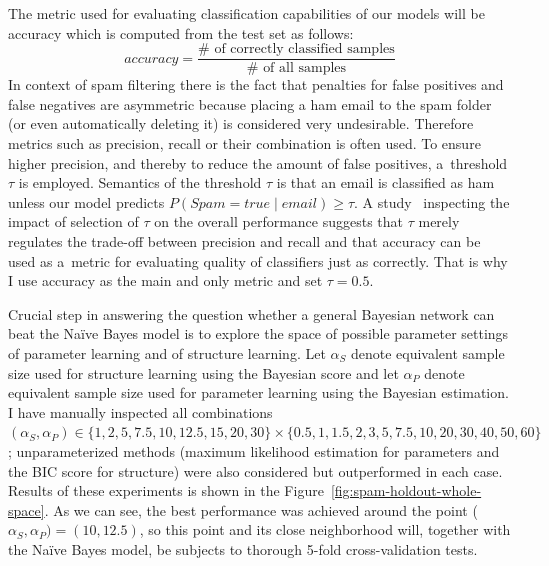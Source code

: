 \documentclass[english,cover]{fitthesis} %
\begin{document}
The metric used for evaluating  classification capabilities of our models will be accuracy which is computed from the test set as follows:
$$accuracy = \frac{\# \text{ of correctly classified samples}}{\# \text{ of all samples}}$$
In context of spam filtering there is the fact that penalties for false positives and false negatives are asymmetric because placing a ham email to the spam folder (or even automatically deleting it) is considered very undesirable. Therefore metrics such as precision, recall or their combination is often used. To ensure higher precision, and thereby to reduce the amount of false positives, a~threshold $\tau$ is employed. Semantics of the threshold $\tau$ is that an email is classified as ham unless our model predicts $P(Spam = true \mid email) \geq \tau$.
A study~\cite{androutsopoulos00_spam} inspecting the impact of selection of $\tau$ on the overall performance suggests that $\tau$ merely regulates the trade-off between precision and recall and that accuracy can be used as a~metric for evaluating quality of classifiers just as correctly. That is why I use accuracy as the main and only metric and set $\tau = 0.5$.

\medskip
Crucial step in answering the question whether a general Bayesian network can beat the Naïve Bayes model is to explore the space of possible parameter settings of parameter learning and of structure learning. Let $\alpha_S$ denote equivalent sample size used for structure learning using the Bayesian score and let $\alpha_P$ denote equivalent sample size used for parameter learning using the Bayesian estimation. I have manually inspected all combinations $(\alpha_S, \alpha_P) \in \lbrace 1, 2, 5, 7.5, 10, 12.5, 15, 20, 30\rbrace \times \lbrace 0.5, 1, 1.5, 2, 3, 5, 7.5, 10, 20, 30, 40, 50, 60 \rbrace$; unparameterized methods (maximum likelihood estimation for parameters and the BIC score for structure) were also considered but outperformed in each case. Results of these experiments is shown in the Figure~\ref{fig:spam-holdout-whole-space}. As we can see, the best performance was achieved around the point ($\alpha_S, \alpha_P) = (10, 12.5)$, so this point and its close neighborhood will, together with the Naïve Bayes model, be subjects to thorough 5-fold cross-validation tests.
\end{document}
